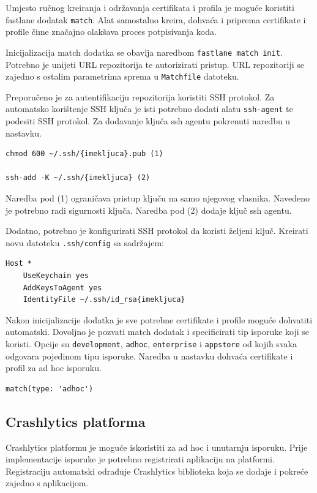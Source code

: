 \documentclass[times, utf8, diplomski, numeric]{fer}
\begin{document}
\begin{appendices}
Umjesto ručnog kreiranja i održavanja certifikata i profila je moguće koristiti fastlane dodatak \verb|match|\citep{fastlane:match}. Alat samostalno kreira, dohvaća i priprema certifikate i profile čime značajno olakšava proces potpisivanja koda.

Inicijalizacija match dodatka se obavlja naredbom \verb|fastlane match init|. Potrebno je unijeti URL repozitorija te autorizirati pristup. URL repozitoriji se zajedno s ostalim parametrima sprema u \verb|Matchfile| datoteku.

Preporučeno je za autentifikaciju repozitorija koristiti SSH protokol. Za automatsko korištenje SSH ključa je isti potrebno dodati alatu \verb|ssh-agent| te podesiti SSH protokol. Za dodavanje ključa ssh agentu pokrenuti naredbu u nastavku.

\begin{verbatim}
chmod 600 ~/.ssh/{imekljuca}.pub (1)

ssh-add -K ~/.ssh/{imekljuca} (2)
\end{verbatim}

Naredba pod (1) ograničava pristup ključu na samo njegovog vlasnika. Navedeno je potrebno radi sigurnosti ključa. Naredba pod (2) dodaje ključ ssh agentu.

Dodatno, potrebno je konfigurirati SSH protokol da koristi željeni ključ. Kreirati novu datoteku \verb|.ssh/config| sa sadržajem:

\begin{verbatim}
Host *
    UseKeychain yes
    AddKeysToAgent yes
    IdentityFile ~/.ssh/id_rsa{imekljuca}
\end{verbatim}

Nakon inicijalizacije dodatka je sve potrebne certifikate i profile moguće dohvatiti automatski. Dovoljno je pozvati match dodatak i specificirati tip isporuke koji se koristi. Opcije su \verb|development|, \verb|adhoc|, \verb|enterprise| i \verb|appstore| od kojih svaka odgovara pojedinom tipu isporuke. Naredba u nastavku dohvaća certifikate i profil za ad hoc isporuku.

\begin{verbatim}
match(type: 'adhoc')
\end{verbatim}

\subsection{Crashlytics platforma}

Crashlytics platformu je moguće iskoristiti za ad hoc i unutarnju isporuku. Prije implementacije isporuke je potrebno registrirati aplikaciju na platformi. Registraciju automatski odrađuje Crashlytics biblioteka koja se dodaje i pokreće zajedno s aplikacijom.


\end{appendices}
\end{document}
